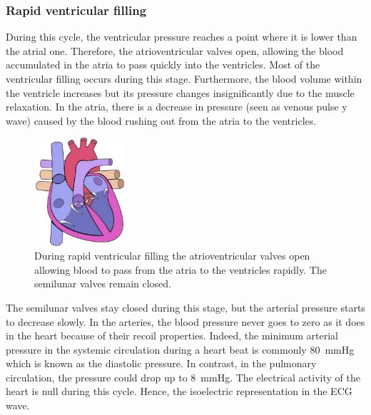 \subsubsection{Rapid ventricular filling}
During this cycle, the ventricular pressure reaches a point where it is lower than the atrial one. Therefore, the atrioventricular valves open, allowing the blood accumulated in the atria to pass quickly into the ventricles. Most of the ventricular filling occurs during this stage. Furthermore, the blood volume within the ventricle increases but its pressure changes insignificantly due to the muscle relaxation. In the atria, there is a decrease in pressure (seen as venous pulse y wave) caused by the blood rushing out from the atria to the ventricles. 

\begin{figure}[!htpb]
	\centering
	\includegraphics[height=4cm,keepaspectratio]{figure_12}
	\caption[Heart during rapid ventricular filling]{During rapid ventricular filling the atrioventricular valves open allowing blood to pass from the atria to the ventricles rapidly. The semilunar valves remain closed.}
	\label{fig:heart rapid ventricular filling}
\end{figure}

The semilunar valves stay closed during this stage, but the arterial pressure starts to decrease slowly. In the arteries, the blood pressure never goes to zero as it does in the heart because of their recoil properties. Indeed, the minimum arterial pressure in the systemic circulation during a heart beat is commonly \SI{80}{\mmHg} which is known as the diastolic pressure. In contrast, in the pulmonary circulation, the pressure could drop up to \SI{8}{\mmHg}. The electrical activity of the heart is null during this cycle. Hence, the isoelectric representation in the ECG wave.


